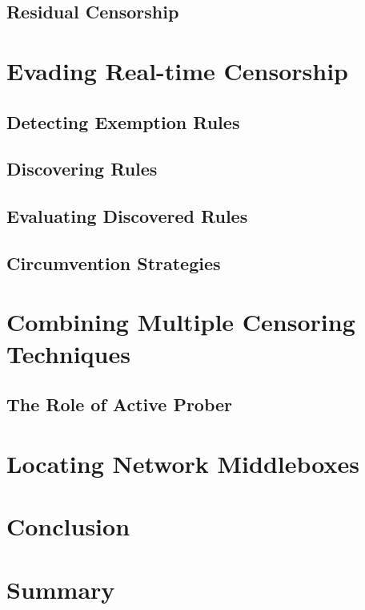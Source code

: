 \subsection{Residual Censorship}
\blindtext

\section{Evading Real-time Censorship}
\blindtext

\subsection{Detecting Exemption Rules}
\blindtext

\subsection{Discovering Rules}
\blindtext

\subsection{Evaluating Discovered Rules}
\blindtext

\subsection{Circumvention Strategies}
\blindtext

\section{Combining Multiple Censoring Techniques}
\blindtext

\subsection{The Role of Active Prober}
\blindtext

\section{Locating Network Middleboxes}
\blindtext

\section{Conclusion}
\blindtext

\section{Summary}
\blindtext